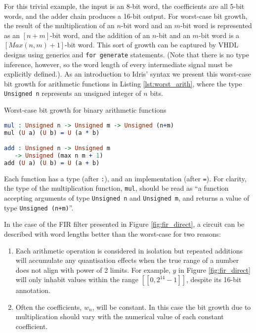 \documentclass[conference]{IEEEtran}
\begin{document}

For this trivial example, the input is an 8-bit word, the coefficients are all
5-bit words, and the adder chain produces a 16-bit output. For worst-case bit
growth, the result of the multiplication of an $n$-bit word and an $m$-bit word
is represented as an $[n+m]$-bit word, and the addition of an $n$-bit and an
$m$-bit word is a $[Max(n,m)+1]$-bit word. This sort of growth can be captured
by VHDL designs using generics and \texttt{for generate} statements. (Note that
there is no type inference, however, so the word length of every intermediate
signal must be explicitly defined.). As an introduction to Idris' syntax we
present this worst-case bit growth for arithmetic functions in Listing
\ref{lst:worst_arith}, where the type \texttt{Unsigned n} represents an unsigned
integer of $n$ bits.

\begin{codefig}[h]
  \caption{Worst-case bit growth for binary arithmetic functions}
\begin{lstlisting}[language=idris]
mul : Unsigned n -> Unsigned m -> Unsigned (n+m)
mul (U a) (U b) = U (a * b)

add : Unsigned n -> Unsigned m
   -> Unsigned (max n m + 1)
add (U a) (U b) = U (a + b)
\end{lstlisting}
\label{lst:worst_arith}
\end{codefig}

Each function has a type (after \texttt{:}), and an implementation (after \texttt{=}).
For clarity, the type of the multiplication function, \texttt{mul}, should be
read as ``a function accepting arguments of type \texttt{Unsigned n} and
\texttt{Unsigned m}, and returns a value of type \texttt{Unsigned (n+m)}''.

In the case of the FIR filter presented in Figure \ref{fig:fir_direct}, a circuit can be described with word lengths better than the worst-case for two reasons:

\begin{enumerate}
\item Each arithmetic operation is considered in isolation but repeated
  additions will accumulate any quantisation effects when the true range of a
  number does not align with power of 2 limits. For example, $y$ in Figure
  \ref{fig:fir_direct} will only inhabit values within the range
  $[\![0,2^{14}-1]\!]$, despite its 16-bit annotation.
\item Often the coefficients, $w_n$, will be constant. In this case the bit
  growth due to multiplication should vary with the numerical value of each
  constant coefficient.
\end{enumerate}
\end{document}
